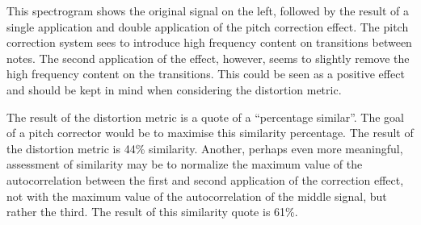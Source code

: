 This spectrogram shows the original signal on the left, followed by the result of
a single application and double application of the pitch correction effect. The
pitch correction system sees to introduce high frequency content on transitions
between notes. The second application of the effect, however, seems to slightly
remove the high frequency content on the transitions. This could be seen as a
positive effect and should be kept in mind when considering the distortion metric.

The result of the distortion metric is a quote of a ``percentage similar''. The
goal of a pitch corrector would be to maximise this similarity percentage. The
result of the distortion metric is 44\% similarity. Another, perhaps even more
meaningful, assessment of similarity may be to normalize the maximum value of the
autocorrelation between the first and second application of the correction effect,
not with the maximum value of the autocorrelation of the middle signal, but rather
the third. The result of this similarity quote is 61\%.
